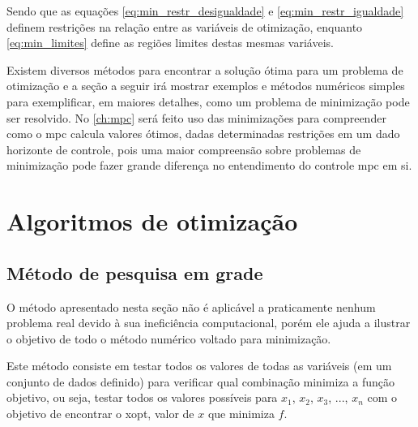 Sendo que as equações \ref{eq:min_restr_desigualdade} e \ref{eq:min_restr_igualdade}
definem restrições na relação entre as variáveis de otimização, enquanto
\ref{eq:min_limites} define as regiões limites destas mesmas variáveis.

Existem diversos métodos para encontrar a solução ótima para um problema de otimização
e a seção a seguir irá mostrar exemplos e métodos numéricos simples para exemplificar,
em maiores detalhes, como um problema de minimização pode ser resolvido. No
\cref{ch:mpc} será feito uso das minimizações para compreender como o \acrshort{mpc}
calcula valores ótimos, dadas determinadas restrições em um dado horizonte de controle,
pois uma maior compreensão sobre problemas de minimização pode fazer grande diferença
no entendimento do controle \acrshort{mpc} em si.

\section{Algoritmos de otimização}
\label{sec:algoritmos_de_otimizacao}

\subsection{Método de pesquisa em grade}
\label{subsec:metodo_pesquisa_em_grade}

O método apresentado nesta seção não é aplicável a praticamente nenhum problema real
devido à sua ineficiência computacional, porém ele ajuda a ilustrar o objetivo de
todo o método numérico voltado para minimização.

Este método consiste em testar todos os valores de todas as variáveis (em um conjunto
de dados definido) para verificar qual combinação minimiza a função objetivo, ou seja,
testar todos os valores possíveis para $x_1$, $x_2$, $x_3$, $...$, $x_n$ com o
objetivo de encontrar o \gls{xopt}, valor de $x$ que minimiza $f$.

